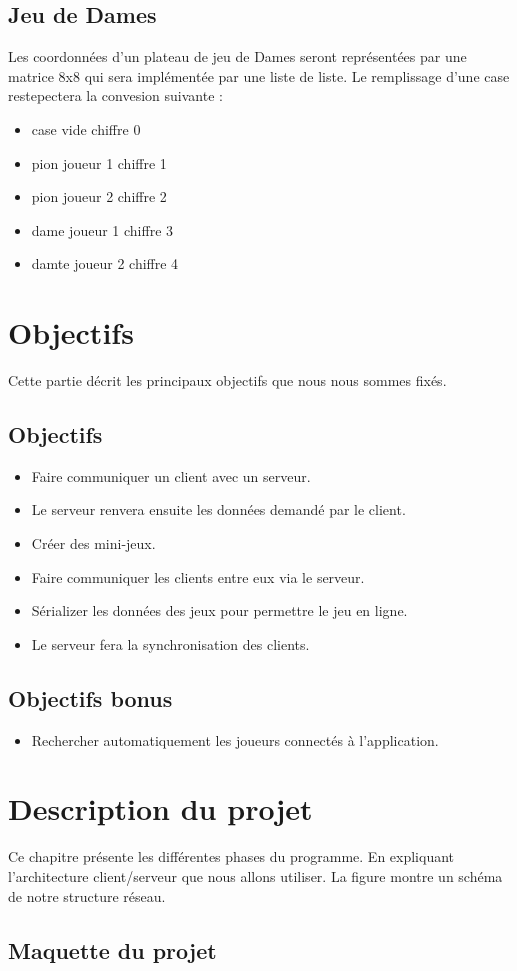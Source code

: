 \documentclass{report}
\begin{document}
\section{Jeu de Dames}
Les coordonnées d'un plateau de jeu de Dames seront représentées par une matrice 8x8 qui sera implémentée par une liste de liste.
Le remplissage d'une case restepectera la convesion suivante :
\begin{itemize}
	\item case vide \tabto{4cm} chiffre 0
	\item pion joueur 1 \tabto{4cm} chiffre 1
	\item pion joueur 2  \tabto{4cm} chiffre 2
	\item dame joueur 1 \tabto{4cm} chiffre 3
	\item damte joueur 2 \tabto{4cm} chiffre 4
\end{itemize}

\chapter{Objectifs}
Cette partie décrit les principaux objectifs que nous nous sommes fixés.
\section{Objectifs}\label{objectifs}
\begin{itemize}
	\item Faire communiquer un client avec un serveur.
	\item Le serveur renvera ensuite les données demandé par le client.
	\item Créer des mini-jeux.
	\item Faire communiquer les clients entre eux via le serveur.
	\item Sérializer les données des jeux pour permettre le jeu en ligne.
	\item Le serveur fera la synchronisation des clients.
\end{itemize}
\section{Objectifs bonus}\label{objectifs-bonus}
\begin{itemize}
	\item Rechercher automatiquement les joueurs connectés à l'application.
\end{itemize}
\chapter{Description du projet}\label{desciption-projet}
Ce chapitre présente les différentes phases du programme. En expliquant l'architecture client/serveur que nous allons utiliser. La figure montre un schéma de notre
structure réseau.
\section{Maquette du projet}\label{maquette}
\end{document}
